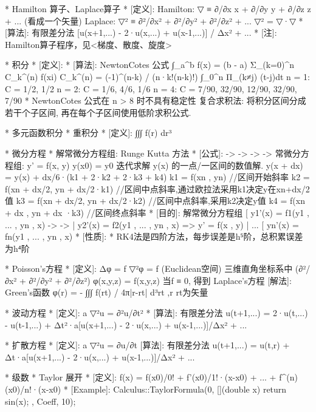			* Hamilton 算子、Laplace算子
			*	[定义]: 
					Hamilton: ▽  ≡ ∂/∂x \vec x + ∂/∂y \vec y + ∂/∂z \vec z + ... (看成一个矢量)
					Laplace:  ▽² ≡ ∂²/∂x² + ∂²/∂y² + ∂²/∂z² + ...
					▽² = ▽·▽
			*	[算法]: 有限差分法
					[u(x+1,...) - 2·u(x,...) + u(x-1,...)] / Δx² + ...
			*	[注]: Hamilton算子程序，见<梯度、散度、旋度>   

    * 积分
    *	[定义]:
    *	[算法]: NewtonCotes 公式
            ∫_a^b f(x) = (b - a) Σ_(k=0)^n  C_k^(n) f(xi)
            C_k^(n) = (-1)^(n-k) / (n·k!(n-k)!) ∫_0^n Π_(k≠j) (t-j)dt 
            n = 1: C = {1/2, 1/2}
            n = 2: C = {1/6, 4/6, 1/6}
            n = 4: C = {7/90, 32/90, 12/90, 32/90, 7/90}
            * NewtonCotes 公式在 n > 8 时不具有稳定性
            复合求积法: 将积分区间分成若干个子区间, 再在每个子区间使用低阶求积公式.

    	* 多元函数积分
			*  重积分
			*	[定义]: ∫∫∫ f(r) dr³
		
* 微分方程
    * 解常微分方程组: Runge Kutta 方法
	*	[公式]:           ->   ->       ->      ->
			常微分方程组: y' = f(x, y)	y(x0) = y0
			迭代求解 \vec y(x) 的一点/一区间的数值解.
			y(x + dx) = y(x) + dx/6·(k1 + 2·k2 + 2·k3 + k4)
			k1 = f(xn , yn)						//区间开始斜率
			k2 = f(xn + dx/2, yn + dx/2·k1)	//区间中点斜率,通过欧拉法采用k1决定y在xn+dx/2值
			k3 = f(xn + dx/2, yn + dx/2·k2)	//区间中点斜率,采用k2决定y值
			k4 = f(xn + dx	, yn + dx  ·k3)	//区间终点斜率
	*	[目的]: 解常微分方程组
			[ y1'(x) = f1(y1 , ... , yn , x)          ->   ->
			| y2'(x) = f2(y1 , ... , yn , x)    =>    y' = f(x , y)
			| ...
			[ yn'(x) = fn(y1 , ... , yn , x)
	*	[性质]:
			* RK4法是四阶方法，每步误差是h⁵阶，总积累误差为h⁴阶


    * Poisson's方程
	*	[定义]: Δφ = f
				▽²φ = f  (Euclidean空间)
			三维直角坐标系中 (∂²/∂x² + ∂²/∂y² + ∂²/∂z²) φ(x,y,z) = f(x,y,z)
			当f ≡ 0, 得到 Laplace's方程
		[解法]:  Green's函数  φ(r) = - ∫∫∫ f(rt) / 4π|r-rt| d³rt    ,r rt为矢量


    * 波动方程
	*	[定义]: a ▽²u = ∂²u/∂t²
	*	[算法]: 有限差分法
			u(t+1,...) = 2·u(t,...) - u(t-1,...)
					+ Δt²·a{[u(x+1,...) - 2·u(x,...) + u(x-1,...)]/Δx² + ...}

	* 扩散方程
	*	[定义]: a ▽²u = ∂u/∂t
		[算法]: 有限差分法
			u(t+1,...) = u(t,r)
					+ Δt·a{[u(x+1,...) - 2·u(x,...) + u(x-1,...)]/Δx² + ...}

* 级数
	* Taylor 展开
	*	[定义]: 
			f(x) = f(x0)/0! + f'(x0)/1!·(x-x0) + ... + f^(n)(x0)/n!·(x-x0)
	*	[Example]:
			Calculus::TaylorFormula(0, [](double x) { return sin(x); }, Coeff, 10);



